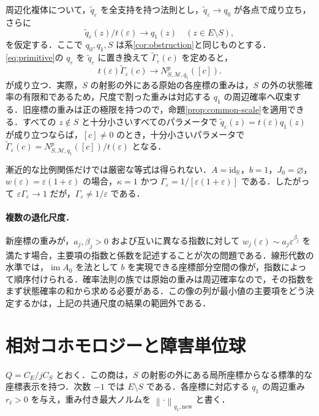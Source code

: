 \documentclass[11pt,a4paper]{article}
\numberwithin{equation}{section}
\theoremstyle{japanese}
\theoremstyle{remark}
\newcommand{\R}{\mathbb R}
\newcommand{\M}{\mathcal M}
\newcommand{\im}{\operatorname{im}}
\newcommand{\id}{\mathrm{id}}
\newcommand{\norm}[1]{\left\lVert #1\right\rVert}
\begin{document}
周辺化複体について，$\widetilde q_\varepsilon$ を全支持を持つ法則とし，$\widetilde q_\varepsilon\to q_0$ が各点で成り立ち，さらに
\[
 \widetilde q_\varepsilon(z)/t(\varepsilon)\longrightarrow q_1(z)
 \quad(z\in E\setminus S),
\]
を仮定する．ここで $q_0,q_1,S$ は系\ref{cor:obstruction}と同じものとする．\eqref{eq:primitive}の $q_\varepsilon$ を $\widetilde q_\varepsilon$ に置き換えて $\widetilde\Gamma_\varepsilon(c)$ を定めると，
\begin{equation}\label{eq:nonaffine-marginal}
 t(\varepsilon)\widetilde\Gamma_\varepsilon(c)
 \longrightarrow N^p_{S,\M,q_1}([c]).
\end{equation}
が成り立つ．実際，$S$ の射影の外にある原始の各座標の重みは，$S$ の外の状態確率の有限和であるため，尺度で割った重みは対応する $q_1$ の周辺確率へ収束する．旧座標の重みは正の極限を持つので，命題\ref{prop:common-scale}を適用できる．すべての $z\notin S$ と十分小さいすべてのパラメータで $\widetilde q_\varepsilon(z)=t(\varepsilon)q_1(z)$ が成り立つならば，$[c]\ne0$ のとき，十分小さいパラメータで $\widetilde\Gamma_\varepsilon(c)=N^p_{S,\M,q_1}([c])/t(\varepsilon)$ となる．

漸近的な比例関係だけでは厳密な等式は得られない．$A=\id_{\R}$，$b=1$，$J_0=\varnothing$，$w(\varepsilon)=\varepsilon(1+\varepsilon)$ の場合，$\kappa=1$ かつ $\Gamma_\varepsilon=1/[\varepsilon(1+\varepsilon)]$ である．したがって $\varepsilon\Gamma_\varepsilon\to1$ だが，$\Gamma_\varepsilon\ne1/\varepsilon$ である．

\paragraph{複数の退化尺度．}
新座標の重みが，$a_j,\beta_j>0$ および互いに異なる指数に対して $w_j(\varepsilon)\sim a_j\varepsilon^{\beta_j}$ を満たす場合，主要項の指数と係数を記述することが次の問題である．線形代数の水準では，$\im A_0$ を法として $b$ を実現できる座標部分空間の像が，指数によって順序付けられる．確率法則の族では原始の重みは周辺確率なので，その指数をまず状態確率の和から求める必要がある．この像の列が最小値の主要項をどう決定するかは，上記の共通尺度の結果の範囲外である．

\section{相対コホモロジーと障害単位球}\label{sec:relative}
$Q=C_E/jC_S$ とおく．この商は，$S$ の射影の外にある局所座標からなる標準的な座標表示を持つ．次数 $-1$ では $E\setminus S$ である．各座標に対応する $q_1$ の周辺重み $r_\ell>0$ を与え，重み付き最大ノルムを $\norm{\cdot}_{q_1,\mathrm{new}}$ と書く．
\end{document}
